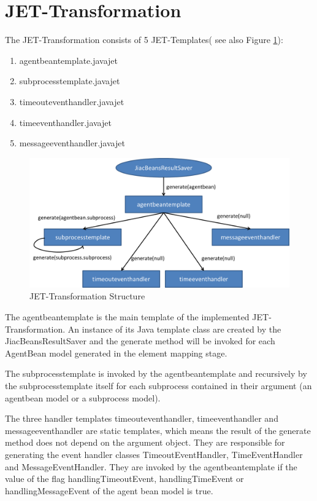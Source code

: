 \section{JET-Transformation}
The JET-Transformation consists of 5 JET-Templates( see also Figure \ref{fig:transformation_structure}): 
\begin{enumerate}
	\item agentbeantemplate.javajet
	\item subprocesstemplate.javajet
	\item timeouteventhandler.javajet
	\item timeeventhandler.javajet
	\item messageeventhandler.javajet
\end{enumerate}

\begin{figure}[h]
	\centering\includegraphics[width=1.0\textwidth]{images/templates_structure.png}
	\caption{JET-Transformation Structure}
	\label{fig:transformation_structure}
\end{figure}

The agentbeantemplate is the main template of the implemented JET-Transformation. An instance of its Java template class are created by the JiacBeansResultSaver and the generate method will be invoked for each AgentBean model generated in the element mapping stage. 

The subprocesstemplate is invoked by the agentbeantemplate and recursively by the subprocesstemplate itself for each subprocess contained in their argument (an agentbean model or a subprocess model). 

The three handler templates timeouteventhandler, timeeventhandler and messageeventhandler are static templates, which means the result of the generate method does not depend on the argument object. They are responsible for generating the event handler classes TimeoutEventHandler, TimeEventHandler and MessageEventHandler. They are invoked by the agentbeantemplate if the value of the flag handlingTimeoutEvent, handlingTimeEvent or handlingMessageEvent of the agent bean model is true.


